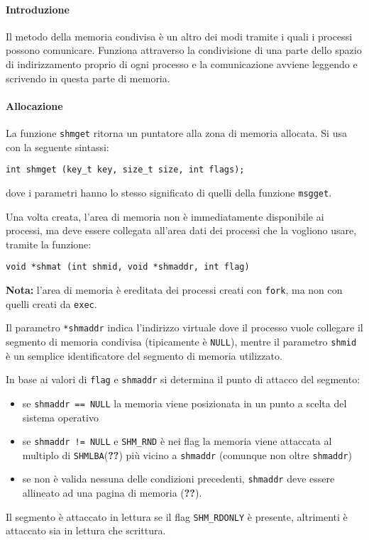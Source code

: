 \documentclass[a4paper]{article}
\begin{document}
\paragraph{Introduzione}
Il metodo della memoria condivisa è un altro dei modi tramite i quali i processi possono comunicare. Funziona attraverso la condivisione di una parte dello spazio di indirizzamento proprio di ogni processo e la comunicazione avviene leggendo e scrivendo in questa parte di memoria.

\paragraph{Allocazione}
La funzione \verb|shmget| ritorna un puntatore alla zona di memoria allocata. Si usa con la seguente sintassi:
\begin{verbatim}
int shmget (key_t key, size_t size, int flags);
\end{verbatim}
dove i parametri hanno lo stesso significato di quelli della funzione \verb|msgget|.

Una volta creata, l'area di memoria non è immediatamente disponibile ai processi, ma deve essere collegata all'area dati dei processi che la vogliono usare, tramite la funzione:
\begin{verbatim}
void *shmat (int shmid, void *shmaddr, int flag)
\end{verbatim}
\textbf{Nota:} l'area di memoria è ereditata dei processi creati con \verb|fork|, ma non con quelli creati da \verb|exec|.

Il parametro \verb|*shmaddr| indica l'indirizzo virtuale dove il processo vuole collegare il segmento di memoria condivisa (tipicamente è \verb|NULL|), mentre il parametro \verb|shmid| è un semplice identificatore del segmento di memoria utilizzato.

In base ai valori di \verb|flag| e \verb|shmaddr| si determina il punto di attacco del segmento:
\begin{itemize}
\item se \verb|shmaddr == NULL| la memoria viene posizionata in un punto a scelta del sistema operativo
\item se \verb|shmaddr != NULL| e \verb|SHM_RND| è nei flag la memoria  viene attaccata al multiplo di \verb|SHMLBA|(\textbf{??}) più vicino a \verb|shmaddr| (comunque non oltre \verb|shmaddr|)
\item se non è valida nessuna delle condizioni precedenti, \verb|shmaddr| deve essere allineato ad una pagina di memoria (\textbf{??}).
\end{itemize}
Il segmento è attaccato in lettura se il flag \verb|SHM_RDONLY| è presente, altrimenti è attaccato sia in lettura che scrittura.
\end{document}
